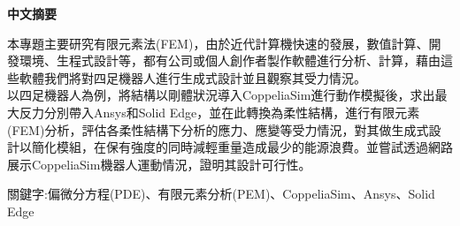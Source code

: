 \renewcommand{\baselinestretch}{1.5} %
\clearpage  %
\sectionef
{} %
\begin{center}
\LARGE\textbf{中文摘要}\\
\end{center}
\begin{flushleft}
\fontsize{20pt}{18pt}\sectionef\hspace{12pt}\quad 本專題主要研究有限元素法(FEM)，由於近代計算機快速的發展，數值計算、開發環境、生程式設計等，都有公司或個人創作者製作軟體進行分析、計算，藉由這些軟體我們將對四足機器人進行生成式設計並且觀察其受力情況。\\[14pt]
\fontsize{20pt}{20pt}\sectionef\hspace{12pt}\quad 以四足機器人為例，將結構以剛體狀況導入CoppeliaSim進行動作模擬後，求出最大反力分別帶入Ansys和Solid Edge，並在此轉換為柔性結構，進行有限元素(FEM)分析，評估各柔性結構下分析的應力、應變等受力情況，對其做生成式設計以簡化模組，在保有強度的同時減輕重量造成最少的能源浪費。並嘗試透過網路展示CoppeliaSim機器人運動情況，證明其設計可行性。\\[14pt]

\end{flushleft}
\begin{center}
\fontsize{14pt}{20pt}\selectfont 關鍵字:偏微分方程(PDE)、有限元素分析(PEM)、CoppeliaSim、Ansys、Solid Edge
\end{center}
\newpage

